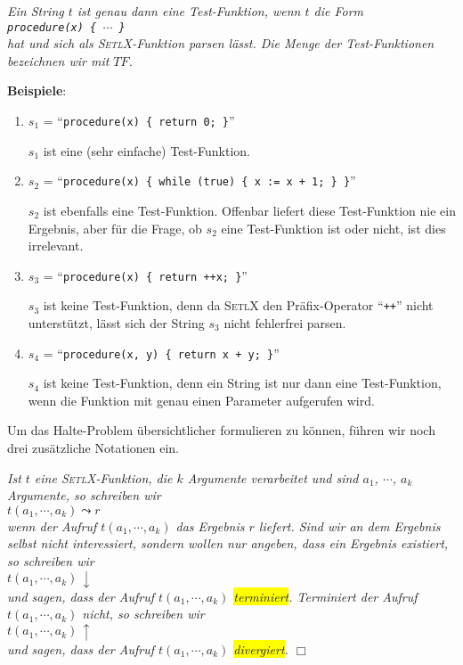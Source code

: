 \begin{Definition} 
{\em Ein String $t$ ist genau dann eine \emph{Test-Funktion}, wenn $t$ 
 die Form \\[0.3cm]
\hspace*{1.3cm} {\tt procedure(x) \{ $\cdots$ \}} \\[0.3cm]
hat und sich als \textsc{SetlX}-Funktion parsen lässt.  Die Menge der
Test-Funktionen bezeichnen wir mit $T\!F$.}  \eox
\end{Definition}

\noindent
\textbf{Beispiele}:  
\begin{enumerate}
\item $s_1$ = ``{\tt procedure(x) \{ return 0; \}}''

      $s_1$ ist eine (sehr einfache) Test-Funktion.
\item $s_2$ = ``{\tt procedure(x) \{ while (true) \{ x := x + 1; \} \}}''

      $s_2$ ist ebenfalls eine Test-Funktion.  Offenbar liefert diese Test-Funktion nie ein
      Ergebnis, aber für die Frage, ob $s_2$ eine Test-Funktion ist oder nicht, ist dies
      irrelevant.
\item $s_3$ = ``{\tt procedure(x) \{ return ++x; \}}''

      $s_3$ ist keine Test-Funktion, denn da \textsc{SetlX} den Präfix-Operator
      ``\texttt{++}'' nicht unterstützt, lässt sich der String $s_3$  nicht fehlerfrei parsen.
\item $s_4$ = ``{\tt procedure(x, y) \{ return x + y; \}}''

      $s_4$ ist keine Test-Funktion, denn ein String ist nur dann eine Test-Funktion, wenn die Funktion
      mit genau einen Parameter aufgerufen wird.
\end{enumerate}
Um das Halte-Problem übersichtlicher formulieren zu können, führen wir noch drei
zusätzliche Notationen ein.
\begin{Notation}[$\leadsto$, $\downarrow$, $\uparrow$]
{\em
Ist $t$ eine \textsc{SetlX}-Funktion, die $k$ Argumente verarbeitet und sind $a_1$, $\cdots$, $a_k$ Argumente,
so schreiben wir \\[0.3cm]
\hspace*{1.3cm} $t(a_1, \cdots, a_k) \leadsto r$ \\[0.3cm]
wenn der Aufruf $t(a_1, \cdots, a_k)$ das Ergebnis $r$ liefert.  Sind wir an dem Ergebnis
selbst nicht interessiert, sondern wollen nur angeben, dass ein Ergebnis existiert, so
schreiben wir \\[0.3cm]
\hspace*{1.3cm} $t(a_1, \cdots, a_k) \,\downarrow$ \\[0.3cm]
und sagen, dass der Aufruf $t(a_1, \cdots, a_k)$ \colorbox{yellow}{\emph{terminiert}}.
Terminiert der Aufruf $t(a_1, \cdots, a_k)$ nicht, so schreiben wir \\[0.3cm]
\hspace*{1.3cm} $t(a_1, \cdots, a_k) \,\uparrow$ \\[0.3cm]
und sagen, dass der Aufruf $t(a_1, \cdots, a_k)$ \colorbox{yellow}{\emph{divergiert}}.
\hspace*{\fill} $\Box$
}
\end{Notation}

